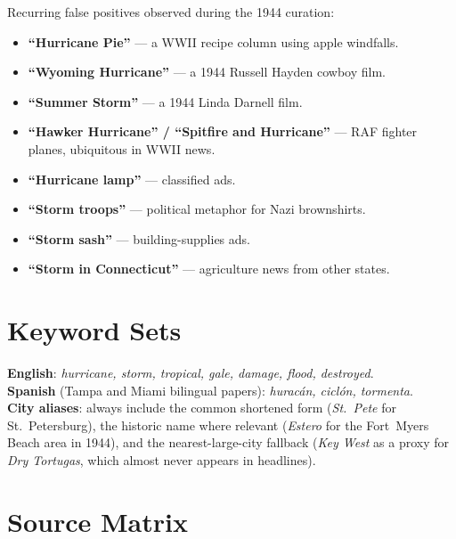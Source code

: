 \documentclass[11pt,letterpaper]{article}
\begin{document}
Recurring false positives observed during the 1944 curation:

\begin{itemize}[leftmargin=1.5em]
  \item \textbf{``Hurricane Pie''} --- a WWII recipe column using apple windfalls.
  \item \textbf{``Wyoming Hurricane''} --- a 1944 Russell Hayden cowboy film.
  \item \textbf{``Summer Storm''} --- a 1944 Linda Darnell film.
  \item \textbf{``Hawker Hurricane'' / ``Spitfire and Hurricane''} --- RAF fighter planes, ubiquitous in WWII news.
  \item \textbf{``Hurricane lamp''} --- classified ads.
  \item \textbf{``Storm troops''} --- political metaphor for Nazi brownshirts.
  \item \textbf{``Storm sash''} --- building-supplies ads.
  \item \textbf{``Storm in Connecticut''} --- agriculture news from other states.
\end{itemize}

\section{Keyword Sets}

\noindent\textbf{English}: \emph{hurricane, storm, tropical, gale, damage, flood, destroyed}.\\
\noindent\textbf{Spanish} (Tampa and Miami bilingual papers): \emph{hurac\'an, cicl\'on, tormenta}.\\
\noindent\textbf{City aliases}: always include the common shortened form (\emph{St.~Pete} for St.~Petersburg), the historic name where relevant (\emph{Estero} for the Fort~Myers Beach area in 1944), and the nearest-large-city fallback (\emph{Key West} as a proxy for \emph{Dry Tortugas}, which almost never appears in headlines).

\section{Source Matrix}
\end{document}
